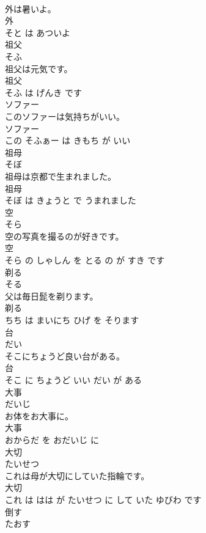 \documentclass[8pt]{extreport}
\begin{document}
\begin{CJK}{UTF8}{min}
\\	外は暑いよ。	
\\	外 
\\	そと は あついよ			
\\	祖父	
\\	そふ			
\\	祖父は元気です。	
\\	祖父 
\\	そふ は げんき です			
\\	ソファー	
\\	このソファーは気持ちがいい。	
\\	ソファー 
\\	この そふぁー は きもち が いい			
\\	祖母	
\\	そぼ			
\\	祖母は京都で生まれました。	
\\	祖母 
\\	そぼ は きょうと で うまれました			
\\	空	
\\	そら			
\\	空の写真を撮るのが好きです。	
\\	空 
\\	そら の しゃしん を とる の が すき です			
\\	剃る	
\\	そる			
\\	父は毎日髭を剃ります。	
\\	剃る 
\\	ちち は まいにち ひげ を そります			
\\	台	
\\	だい			
\\	そこにちょうど良い台がある。	
\\	台 
\\	そこ に ちょうど いい だい が ある			
\\	大事	
\\	だいじ			
\\	お体をお大事に。	
\\	大事 
\\	おからだ を おだいじ に			
\\	大切	
\\	たいせつ			
\\	これは母が大切にしていた指輪です。	
\\	大切 
\\	これ は はは が たいせつ に して いた ゆびわ です			
\\	倒す	
\\	たおす			

\end{CJK}
\end{document}
